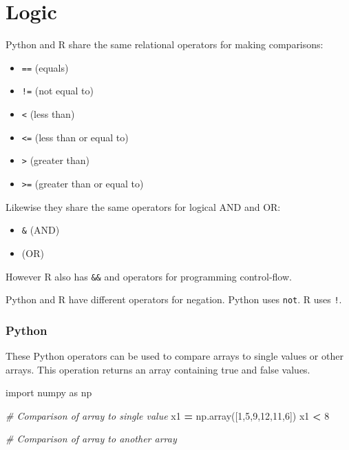 \documentclass[
]{book}
\newenvironment{Shaded}{\begin{snugshade}}{\end{snugshade}}
\newcommand{\CommentTok}[1]{\textcolor[rgb]{0.56,0.35,0.01}{\textit{#1}}}
\newcommand{\DecValTok}[1]{\textcolor[rgb]{0.00,0.00,0.81}{#1}}
\newcommand{\ImportTok}[1]{#1}
\newcommand{\NormalTok}[1]{#1}
\newcommand{\OperatorTok}[1]{\textcolor[rgb]{0.81,0.36,0.00}{\textbf{#1}}}
\providecommand{\tightlist}{%
  \setlength{\itemsep}{0pt}\setlength{\parskip}{0pt}}
\begin{document}
\hypertarget{logic}{%
\section{Logic}\label{logic}}

Python and R share the same relational operators for making comparisons:

\begin{itemize}
\tightlist
\item
  \texttt{==} (equals)
\item
  \texttt{!=} (not equal to)
\item
  \texttt{\textless{}} (less than)
\item
  \texttt{\textless{}=} (less than or equal to)
\item
  \texttt{\textgreater{}} (greater than)
\item
  \texttt{\textgreater{}=} (greater than or equal to)
\end{itemize}

Likewise they share the same operators for logical AND and OR:

\begin{itemize}
\tightlist
\item
  \texttt{\&} (AND)
\item
  \texttt{\textbar{}} (OR)
\end{itemize}

However R also has \texttt{\&\&} and \texttt{\textbar{}\textbar{}} operators for programming control-flow.

Python and R have different operators for negation. Python uses \texttt{not}. R uses \texttt{!}.

\hypertarget{python-4}{%
\subsubsection*{Python}\label{python-4}}

These Python operators can be used to compare arrays to single values or other arrays. This operation returns an array containing true and false values.

\begin{Shaded}
\begin{Highlighting}[]
\ImportTok{import}\NormalTok{ numpy }\ImportTok{as}\NormalTok{ np }

\CommentTok{\# Comparison of array to single value}
\NormalTok{x1 }\OperatorTok{=}\NormalTok{ np.array([}\DecValTok{1}\NormalTok{,}\DecValTok{5}\NormalTok{,}\DecValTok{9}\NormalTok{,}\DecValTok{12}\NormalTok{,}\DecValTok{11}\NormalTok{,}\DecValTok{6}\NormalTok{])}
\NormalTok{x1 }\OperatorTok{\textless{}} \DecValTok{8}

\CommentTok{\# Comparison of array to another array }
\end{Highlighting}
\end{Shaded}
\end{document}
